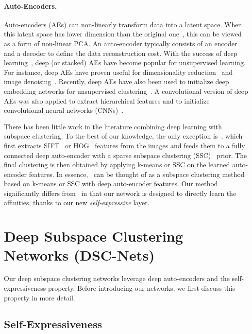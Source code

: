 \documentclass{article}
\begin{document}
\paragraph{Auto-Encoders.} Auto-encoders (AEs) can non-linearly transform data into a latent space. When this latent space has lower dimension than the original one~\cite{hinton2006reducing}, this can be viewed as a form of non-linear PCA. An auto-encoder typically consists of an encoder and a decoder to define the data reconstruction cost. With the success of deep learning~\cite{lecun2015deep}, deep (or stacked) AEs have become popular for unsupervised learning. For instance, deep AEs have proven useful for dimensionality reduction~\cite{hinton2006reducing} and image denoising~\cite{vincent2010stacked}. Recently, deep AEs have also been used to initialize deep embedding networks for unsupervised clustering~\cite{xie2016unsupervised}. A convolutional version of deep AEs was also applied to extract hierarchical features and to initialize convolutional neural networks (CNNs)~\cite{masci2011stacked}.

There has been little work in the literature combining deep learning with subspace clustering. To the best of our knowledge, the only exception is~\cite{peng2016deep}, which 
first extracts SIFT~\cite{lowe2004distinctive} or HOG~\cite{dalal2005histograms} features from the images and feeds them to a fully connected deep auto-encoder with a sparse subspace clustering (SSC)~\cite{elhamifar2013sparse} prior. The final clustering is then obtained by applying k-means or SSC on the learned auto-encoder features. In essence,~\cite{peng2016deep} can be thought of as a subspace clustering method based on k-means or SSC with deep auto-encoder features. Our method significantly differs from~\cite{peng2016deep} in that our network is designed to directly learn the affinities, thanks to our new \emph{self-expressive} layer.

\section{Deep Subspace Clustering Networks (DSC-Nets)}

Our deep subspace clustering networks leverage deep auto-encoders and the self-expressiveness property. Before introducing our networks, we first discuss this property in more detail.

\subsection{Self-Expressiveness}
\end{document}
